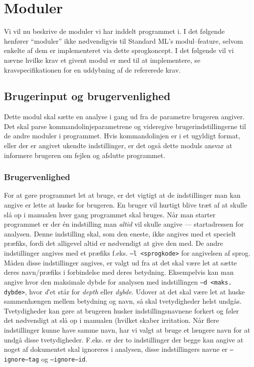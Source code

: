 \documentclass[a4paper,oneside]{memoir}
\begin{document}
\newpage
\section{Moduler}
Vi vil nu beskrive de moduler vi har inddelt programmet i. I det
følgende henfører ``moduler'' ikke nødvendigvis til Standard ML's
modul--feature, selvom enkelte af dem er implementeret via dette
sprogkoncept. I det følgende vil vi nævne hvilke krav et givent modul
er med til at implementere, se kravspecifikationen for en uddybning af
de refererede krav.

\subsection{Brugerinput og brugervenlighed}
Dette modul skal sætte en analyse i gang ud fra de parametre brugeren
angiver. Det skal parse kommandolinjeparametrene og videregive
brugerindstillingerne til de andre moduler i programmet. Hvis
kommandolinjen er i et ugyldigt format, eller der er angivet ukendte
indstillinger, er det også dette moduls ansvar at informere brugeren
om fejlen og afslutte programmet.

\subsubsection{Brugervenlighed}
For at gøre programmet let at bruge, er det vigtigt at de
indstillinger man kan angive er lette at huske for brugeren. En bruger
vil hurtigt blive træt af at skulle slå op i manualen hver gang
programmet skal bruges. Når man starter programmet er der én
indstilling man \textit{altid} vil skulle angive --- startadressen for
analysen. Denne indstilling skal, som den eneste, ikke angives med et
specielt præfiks, fordi det alligevel altid er nødvendigt at give den
med. De andre indstillinger angives med et præfiks f.eks. \texttt{--l
  <sprogkode>} for angivelsen af sprog. Måden disse indstillinger
angives, er valgt ud fra at det skal være let at sætte deres
navn/præfiks i forbindelse med deres betydning. Eksempelvis kan man
angive hvor den maksimale dybde for analysen med indstillingen
\texttt{--d <maks. dybde>}, hvor \textit{d}'et står for \textit{depth}
eller \textit{dybde}. Udover at det skal være let at huske
sammenhængen mellem betydning og navn, så skal tvetydigheder helst
undgås. Tvetydigheder kan gøre at brugeren husker indstillingsnavnene
forkert og føler det nødvendigt at slå op i manualen (hvilket skaber
irritation. Når flere indstillinger kunne have samme navn, har vi
valgt at bruge et længere navn for at undgå disse
tvetydigheder. F.eks. er der to indstillinger der begge kan angive at
noget af dokumentet skal ignoreres i analysen, disse indstillingers
navne er \texttt{--ignore--tag} og \texttt{--ignore--id}.
\end{document}
